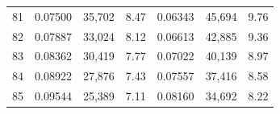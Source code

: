 \begin{tabular}{cccc|ccc}
81   & 0.07500                                                          & 35,702                                                                                            & 8.47                                                                                                                       & 0.06343                                                          & 45,694                                                                                            & 9.76                                                                                                                       \\
82   & 0.07887                                                          & 33,024                                                                                            & 8.12                                                                                                                       & 0.06613                                                          & 42,885                                                                                            & 9.36                                                                                                                       \\
83   & 0.08362                                                          & 30,419                                                                                            & 7.77                                                                                                                       & 0.07022                                                          & 40,139                                                                                            & 8.97                                                                                                                       \\
84   & 0.08922                                                          & 27,876                                                                                            & 7.43                                                                                                                       & 0.07557                                                          & 37,416                                                                                            & 8.58                                                                                                                       \\
85   & 0.09544                                                          & 25,389                                                                                            & 7.11                                                                                                                       & 0.08160                                                          & 34,692                                                                                            & 8.22                                                                                                                       \\

\end{tabular}
